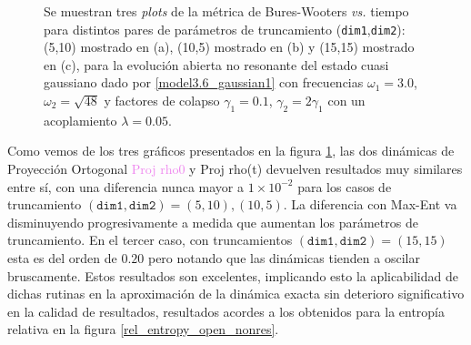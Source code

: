 \documentclass{report} %
\numberwithin{equation}{section}
\begin{document}
\begin{figure}
\caption{Se muestran tres \textit{plots} de la métrica de Bures-Wooters \textit{vs.} tiempo para distintos pares de parámetros de truncamiento (\texttt{dim1},\texttt{dim2}): (5,10) mostrado en (a), (10,5) mostrado en (b) y (15,15) mostrado en (c), para la evolución abierta no resonante del estado cuasi gaussiano dado por \eqref{model3.6_gaussian1} con frecuencias $\omega_1 = 3.0$, $\omega_2 = \sqrt{48}$ y factores de colapso $\gamma_1 = 0.1$, $\gamma_2 = 2 \gamma_1$ con un acoplamiento $\lambda = 0.05$. }
\label{bxb-closed-res/bxb_open_nr.png}
\end{figure}

Como vemos de los tres gráficos presentados en la figura \ref{bxb-closed-res/bxb_open_nr.png},
las dos dinámicas de Proyección Ortogonal \textcolor{violet}{Proj rho0} y \textcolor{awesome}{Proj rho(t)} devuelven resultados muy similares entre sí, con una diferencia nunca mayor a $1\times 10^{-2}$ para los casos de truncamiento $(\texttt{dim1},\texttt{dim2})=(5,10),(10,5)$. La diferencia con Max-Ent va disminuyendo progresivamente a medida que aumentan los parámetros de truncamiento. En el tercer caso, con truncamientos $(\texttt{dim1},\texttt{dim2})=(15,15)$ esta es del orden de $0.20$ pero notando que las dinámicas tienden a oscilar bruscamente. Estos resultados son excelentes, implicando esto la aplicabilidad de dichas rutinas en la aproximación de la dinámica exacta sin deterioro significativo en la calidad de resultados, resultados acordes a los obtenidos para la entropía relativa en la figura \ref{rel_entropy_open_nonres}.
\end{document}
